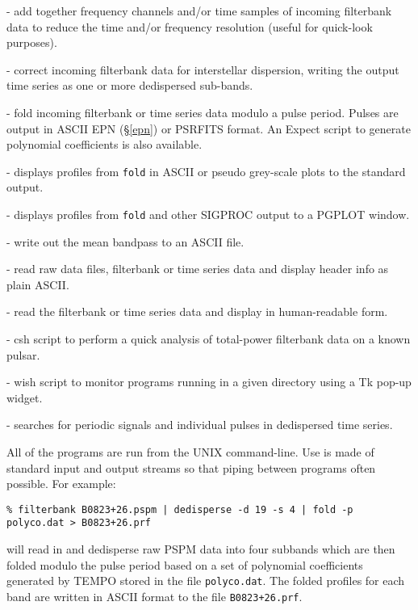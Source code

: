 \documentclass[11pt]{article}
\begin{document}
\smallskip
{} - add together frequency channels
and/or time samples of incoming filterbank data to reduce
the time and/or frequency resolution (useful for quick-look
purposes).

\smallskip
{} - correct incoming filterbank data
for interstellar dispersion, writing the output time series as
one or more dedispersed sub-bands.

\smallskip
{} - fold incoming filterbank or time series
data modulo a pulse period. Pulses are output in ASCII
EPN (\S \ref{epn}) or PSRFITS format. An Expect script to 
generate polynomial coefficients is also available.

\smallskip
{} - displays profiles from {\tt fold} in
ASCII or pseudo grey-scale plots to the standard output.

\smallskip
{} - displays profiles from {\tt fold} 
and other SIGPROC output to a PGPLOT window.

\smallskip
{} - write out the mean bandpass to an ASCII file.

\smallskip
{} - read raw data files,
filterbank or time series data and display header info as plain ASCII.

\smallskip
{} - read the filterbank or time series
data and display in human-readable form.

\smallskip
{} - csh script to perform a quick
analysis of total-power filterbank data on a known pulsar.

\smallskip
{} - wish script to
monitor programs running in a given
directory using a Tk pop-up widget.

\smallskip
{} - searches for periodic signals and individual
pulses in dedispersed time series.

\bigskip
\noindent
All of the programs are run
from the UNIX command-line. Use is made of standard input and output
streams so that piping between programs often possible. For example:
\begin{verbatim}
% filterbank B0823+26.pspm | dedisperse -d 19 -s 4 | fold -p polyco.dat > B0823+26.prf
\end{verbatim}
will read in and dedisperse raw PSPM data into four subbands which are
then folded modulo the pulse period based on a set of polynomial
coefficients generated by TEMPO stored in the file {\tt polyco.dat}.
The folded profiles for each band are written in ASCII format
to the file {\tt B0823+26.prf}.  
\end{document}
